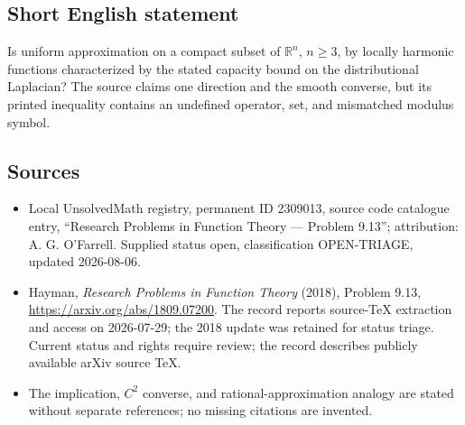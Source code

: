 \documentclass[11pt]{article}
\newcommand{\R}{\mathbb{R}}
\begin{document}
\subsection{Short English statement}
Is uniform approximation on a compact subset of $\R^n$, $n\geq3$, by locally harmonic functions characterized by the stated capacity bound on the distributional Laplacian? The source claims one direction and the smooth converse, but its printed inequality contains an undefined operator, set, and mismatched modulus symbol.
\subsection{Sources}
\begin{itemize}
\item Local UnsolvedMath registry, permanent ID 2309013, source code catalogue entry, ``Research Problems in Function Theory --- Problem 9.13''; attribution: A. G. O'Farrell. Supplied status open, classification OPEN-TRIAGE, updated 2026-08-06.
\item Hayman, \emph{Research Problems in Function Theory} (2018), Problem 9.13, \url{https://arxiv.org/abs/1809.07200}. The record reports source-TeX extraction and access on 2026-07-29; the 2018 update was retained for status triage. Current status and rights require review; the record describes publicly available arXiv source TeX.
\item The implication, $C^2$ converse, and rational-approximation analogy are stated without separate references; no missing citations are invented.
\end{itemize}
\end{document}
